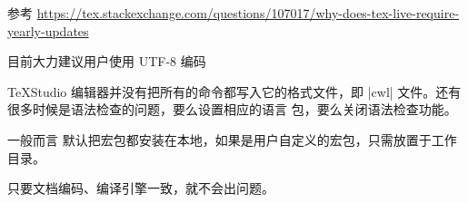 
参考  \url{https://tex.stackexchange.com/questions/107017/why-does-tex-live-require-yearly-updates}







目前大力建议用户使用 UTF-8 编码



TeXStudio 编辑器并没有把所有的命令都写入它的格式文件，即 |cwl| 文件。还有很多时候是语法检查的问题，要么设置相应的语言
包，要么关闭语法检查功能。



一般而言 \TeXLive{} 默认把宏包都安装在本地，如果是用户自定义的宏包，只需放置于工作目录。







只要文档编码、编译引擎一致，就不会出问题。





